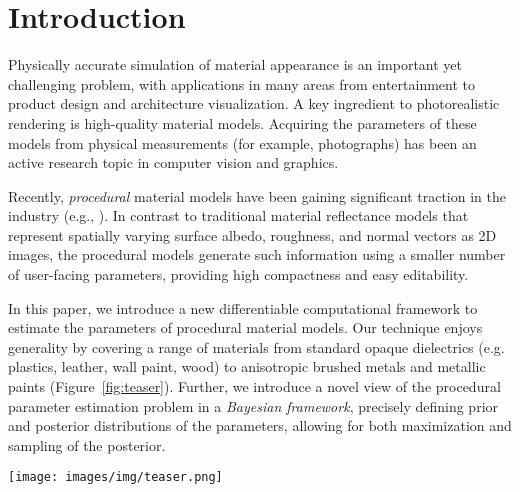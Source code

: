 \section{Introduction}
\label{sec:intro}
%
Physically accurate simulation of material appearance is an important yet challenging problem, with applications in many areas from entertainment to product design and architecture visualization.
A key ingredient to photorealistic rendering is high-quality material models.
Acquiring the parameters of these models from physical measurements (for example, photographs) has been an active research topic in computer vision and graphics.

Recently, \emph{procedural} material models have been gaining significant traction in the industry (e.g., \cite{Substance}).
In contrast to traditional material reflectance models that represent spatially varying surface albedo, roughness, and normal vectors as 2D images, the procedural models generate such information using a smaller number of user-facing parameters, providing high compactness and easy editability.

In this paper, we introduce a new differentiable computational framework to estimate the parameters of procedural material models.
Our technique enjoys generality by covering a range of materials from standard opaque dielectrics (e.g. plastics, leather, wall paint, wood) to anisotropic brushed metals and metallic paints (Figure~\ref{fig:teaser}). %
Further, we introduce a novel view of the procedural parameter estimation problem in a \emph{Bayesian framework}, precisely defining prior and posterior distributions of the parameters, allowing for both maximization and sampling of the posterior.


 \begin{figure*}[t]
 	\centering
 	\texttt{[image: images/img/teaser.png]}
 	\caption{\label{fig:teaser}
 		A scene rendered with material parameters estimated using our method: bumpy dielectrics, leather, plaster, wood, brushed metal, and metallic paint. The insets show a few examples of the initial flash photograph, and our procedural material with parameters found by posterior maximization.
 	}
 \end{figure*}

